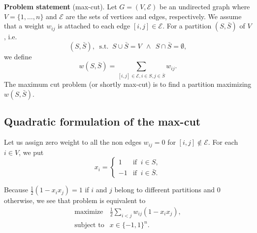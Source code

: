 \documentclass[12pt]{book}
\theoremstyle{definition}
\begin{document}
{\bf Problem statement} (max-cut).
Let $G = (V, \mathcal{E} )$ be an undirected graph where $V = \{1, \dots , n\}$ and $\mathcal{E}$ are the sets of vertices
and edges, respectively. We assume that a weight $w_{ij}$ is attached to each edge $[i, j] \in \mathcal{E}$.
For a partition $(S, \bar{S})$ of $V$, i.e. 
\begin{equation*}
(S, \bar{S}), \ \mbox{ s.t. } \ S \cup \bar{S} = V \ \ \wedge \ \ S\cap \bar{S} = \emptyset,
\end{equation*}
 we define
\begin{equation*}
w(S,\bar{S}) = \sum_{[i,j]\in\mathcal{E}, i\in S, j\in \bar{S}} w_{ij}.
\end{equation*}
The maximum cut problem (or shortly max-cut) is to find a partition maximizing $w(S,\bar{S})$.

\subsection{Quadratic formulation of the max-cut}
Let us assign zero weight to all the non edges $w_{ij} = 0$ for $[i,j]\notin \mathcal{E}$.
For each $i \in V$, we put
\begin{equation*}
x_i = \left\lbrace \begin{array}{rl}
1 & \mbox{if } \ i \in S, \\
-1 & \mbox{if } \ i \in \bar{S}.
\end{array}\right.
\end{equation*}

Because $\frac{1}{2}(1-x_ix_j ) = 1$ if $i$ and $j$ belong to different partitions and 0 otherwise, we see that
problem is equivalent to 
\begin{equation}
\label{maxcut2}
\begin{array}{ll}
\mbox{maximize} & \frac{1}{2}\sum_{i<j}w_{ij}(1-x_ix_j ), \\
\mbox{subject to} &  x \in \{-1,1\}^n.
\end{array}
\end{equation}
\end{document}
